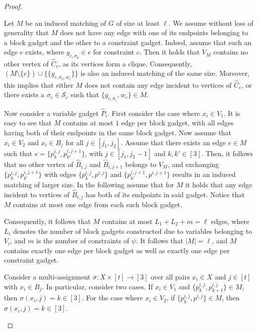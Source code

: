 \begin{proof}
    \begin{claimproof}
        Let $M$ be an induced matching of $G$ of size at least $\ell$.
        We assume without loss of generality that $M$ does not have any edge with one
        of its endpoints belonging to a block gadget and the other to a constraint gadget.
        Indeed, assume that such an edge $e$ exists, where $y_{c,\sigma_0} \in e$ for constraint $c$.
        Then it holds that $V_M$ contains no other vertex of $\hat{C}_c$,
        as its vertices form a clique.
        Consequently, $(M \setminus \{e\}) \cup \{\{y_{c,\sigma_0, w_c}\}\}$ is also an induced matching of the same size.
        Moreover, this implies that either $M$ does not contain any edge incident to vertices of $\hat{C}_c$,
        or there exists a $\sigma_c \in \mathcal{S}_c$ such that $\{y_{c,\sigma_c}, w_c\} \in M$.

        Now consider a variable gadget $\hat{P}_i$.
        First consider the case where $x_i \in V_1$.
        It is easy to see that $M$ contains at most $1$ edge per block gadget,
        with all edges having both of their endpoints in the same block gadget.
        Now assume that $x_i \in V_2$ and $x_i \in B_j$ for all $j \in [j_1,j_2]$.
        Assume that there exists an edge $e \in M$ such that $e = \{p^{i,j}_k,p^{i,j+1}_{k'}\}$,
        with $j \in [j_1,j_2-1]$ and $k,k' \in [3]$.
        Then, it follows that no other vertex of $\hat{B}_{i,j}$ and $\hat{B}_{i,j+1}$ belongs to $V_M$,
        and exchanging $\{p^{i,j}_k,p^{i,j+1}_{k'}\}$ with edges $\{p^{i,j}_k,p^{i,j}\}$ and $\{p^{i,j+1}_{k'},p^{i,j+1}\}$
        results in an induced matching of larger size.
        In the following assume that for $M$ it holds that any edge incident to vertices of $\hat{B}_{i,j}$ has
        both of its endpoints in said gadget. Notice that $M$ contains at most one edge from each such block gadget.

        Consequently, it follows that $M$ contains at most $L_1 + L_2 + m = \ell$ edges,
        where $L_i$ denotes the number of block gadgets constructed due to variables belonging
        to $V_i$, and $m$ is the number of constraints of $\psi$.
        It follows that $|M| = \ell$, and $M$ contains exactly one edge per block gadget
        as well as exactly one edge per constraint gadget.

        Consider a multi-assignment $\sigma \colon X \times [t] \to [3]$ over all pairs $x_i \in X$ and $j \in [t]$
        with $x_i \in B_j$.
        In particular, consider two cases.
        If $x_i \in V_1$ and $\{p^{i,j}_k, p^{i,j}_{k+1}\} \in M$,
        then $\sigma(x_i,j) = k \in [3]$.
        For the case where $x_i \in V_2$, if $\{p^{i,j}_k, p^{i,j}\} \in M$,
        then $\sigma(x_i,j) = k \in [3]$.


\end{claimproof}
\end{proof}
